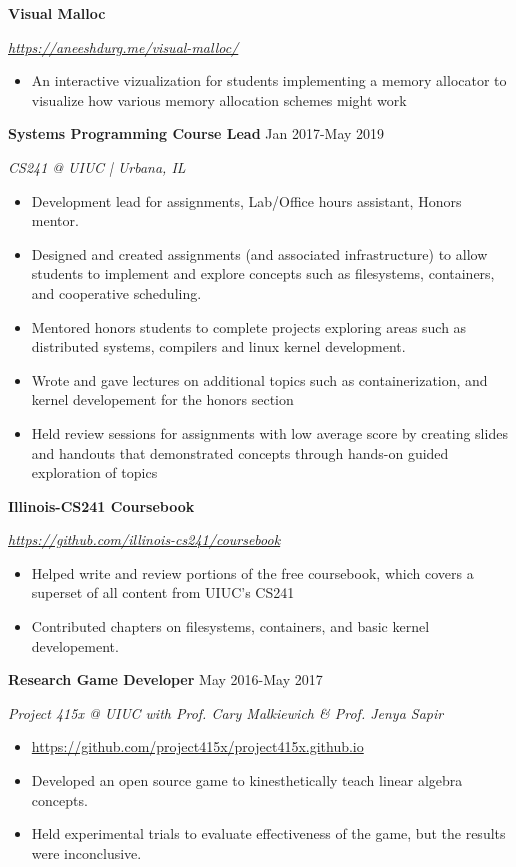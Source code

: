 \documentclass[paper=a4,fontsize=11pt]{scrartcl} %
\newcommand{\EducationEntry}[4]{
		\noindent \textbf{#1}     %
			\hfill#2 \par  %
		\noindent \textit{#3} \par        %
		\noindent\hangafter=0 \small #4 %
		\normalsize \par}
\begin{document}
\EducationEntry{Visual Malloc}{}{\url{https://aneeshdurg.me/visual-malloc/}} {
\begin{itemize}
\item An interactive vizualization for students implementing a memory allocator to visualize how various memory allocation schemes might work
\end{itemize}
}

\EducationEntry{Systems Programming Course Lead}{Jan 2017-May 2019}{CS241 @ UIUC | Urbana, IL}{
\begin{itemize}
  \item Development lead for assignments, Lab/Office hours assistant, Honors mentor.
  \item Designed and created assignments (and associated infrastructure) to allow students to implement and explore concepts such as filesystems, containers, and cooperative scheduling.
  \item Mentored honors students to complete projects exploring areas such as distributed systems, compilers and linux kernel development.
  \item Wrote and gave lectures on additional topics such as containerization, and kernel developement for the honors section
  \item Held review sessions for assignments with low average score by creating slides and handouts that demonstrated concepts through hands-on guided exploration of topics
\end{itemize}
}

\EducationEntry{Illinois-CS241 Coursebook}{}{\url{https://github.com/illinois-cs241/coursebook}}{
\begin{itemize}
  \item Helped write and review portions of the free coursebook, which covers a superset of all content from UIUC's CS241
  \item Contributed chapters on filesystems, containers, and basic kernel developement.
\end{itemize}
}

\EducationEntry{Research Game Developer}{May 2016-May 2017}{Project 415x @ UIUC with Prof. Cary Malkiewich \& Prof. Jenya Sapir}{
\begin{itemize}
\item \url{https://github.com/project415x/project415x.github.io}
\item Developed an open source game to kinesthetically teach linear algebra concepts.
\item Held experimental trials to evaluate effectiveness of the game, but the results were inconclusive.
\end{itemize}
}
\end{document}
